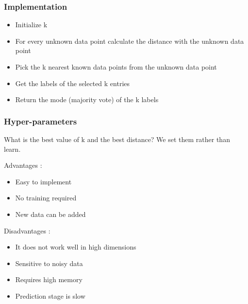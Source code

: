 \documentclass[../main.tex]{subfiles}
\begin{document}
\subsubsection{Implementation}
\begin{itemize}
    \item Initialize k\\
    \item For every unknown data point calculate the distance with the unknown data point\\
    \item Pick the k nearest known data points from the unknown data point\\
    \item Get the labels of the selected k entries\\
    \item Return the mode (majority vote) of the k labels\\
\end{itemize}

\subsubsection{Hyper-parameters}
What is the best value of k and the best distance? We set them rather than learn.\\


\begin{minipage}{.49\textwidth}
    Advantages : \begin{itemize}
        \item Easy to implement \\
        \item No training required \\
        \item New data can be added\\
    \end{itemize}
\end{minipage}
\vline
\begin{minipage}{.49\textwidth}
    Disadvantages : \begin{itemize}
        \item It does not work well in high dimensions\\
        \item Sensitive to noisy data\\
        \item Requires high memory\\
        \item Prediction stage is slow\\
    \end{itemize}
\end{minipage}
\end{document}
